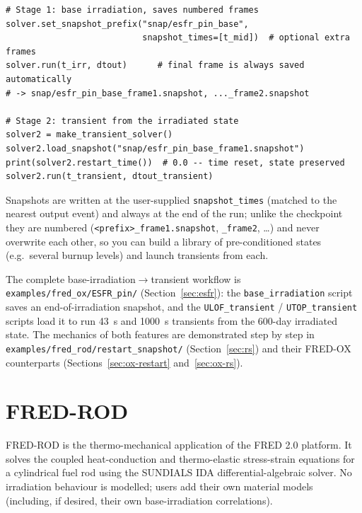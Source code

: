 \documentclass[11pt,a4paper]{article}
\begin{document}
\begin{lstlisting}
# Stage 1: base irradiation, saves numbered frames
solver.set_snapshot_prefix("snap/esfr_pin_base",
                           snapshot_times=[t_mid])  # optional extra frames
solver.run(t_irr, dtout)      # final frame is always saved automatically
# -> snap/esfr_pin_base_frame1.snapshot, ..._frame2.snapshot

# Stage 2: transient from the irradiated state
solver2 = make_transient_solver()
solver2.load_snapshot("snap/esfr_pin_base_frame1.snapshot")
print(solver2.restart_time())  # 0.0 -- time reset, state preserved
solver2.run(t_transient, dtout_transient)
\end{lstlisting}

Snapshots are written at the user-supplied \texttt{snapshot\_times}
(matched to the nearest output event) and always at the end of the run;
unlike the checkpoint they are numbered
(\texttt{<prefix>\_frame1.snapshot}, \texttt{\_frame2}, \ldots) and never
overwrite each other, so you can build a library of pre-conditioned states
(e.g.\ several burnup levels) and launch transients from each.

\begin{infobox}
  The complete base-irradiation$\to$transient workflow is
  \texttt{examples/fred\_ox/ESFR\_pin/} (Section~\ref{sec:esfr}): the
  \texttt{base\_irradiation} script saves an end-of-irradiation snapshot,
  and the \texttt{ULOF\_transient} / \texttt{UTOP\_transient} scripts load
  it to run 43~s and 1000~s transients from the 600-day irradiated state.
  The mechanics of both features are demonstrated step by step in
  \texttt{examples/fred\_rod/restart\_snapshot/} (Section~\ref{sec:rs})
  and their FRED-OX counterparts (Sections~\ref{sec:ox-restart}
  and~\ref{sec:ox-rs}).
\end{infobox}

\part{FRED-ROD}
\label{part:rod}

FRED-ROD is the thermo-mechanical application of the FRED 2.0 platform.  It
solves the coupled heat-conduction and thermo-elastic stress-strain equations
for a cylindrical fuel rod using the SUNDIALS IDA differential-algebraic
solver.  No irradiation behaviour is modelled; users add their own material
models (including, if desired, their own base-irradiation correlations).
\end{document}
